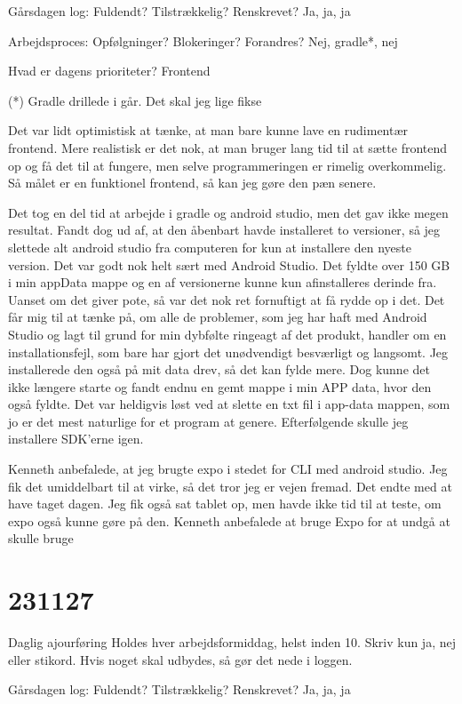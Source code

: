 \documentclass{report}
\begin{document}
Gårsdagen log: Fuldendt? Tilstrækkelig? Renskrevet?
Ja, ja, ja
 
Arbejdsproces: Opfølgninger? Blokeringer? Forandres?
Nej, gradle*, nej
 
Hvad er dagens prioriteter?
Frontend
 
(*) Gradle drillede i går. Det skal jeg lige fikse
 
Det var lidt optimistisk at tænke, at man bare kunne lave en rudimentær frontend. Mere realistisk er det nok, at man bruger lang tid til at sætte frontend op og få det til at fungere, men selve programmeringen er rimelig overkommelig.
Så målet er en funktionel frontend, så kan jeg gøre den pæn senere.
 
Det tog en del tid at arbejde i gradle og android studio, men det gav ikke megen resultat. Fandt dog ud af, at den åbenbart havde installeret to versioner, så jeg slettede alt android studio fra computeren for kun at installere den nyeste version.
Det var godt nok helt sært med Android Studio. Det fyldte over 150 GB i min appData mappe og en af versionerne kunne kun afinstalleres derinde fra.
Uanset om det giver pote, så var det nok ret fornuftigt at få rydde op i det.
Det får mig til at tænke på, om alle de problemer, som jeg har haft med Android Studio og lagt til grund for min dybfølte ringeagt af det produkt, handler om en installationsfejl, som bare har gjort det unødvendigt besværligt og langsomt.
Jeg installerede den også på mit data drev, så det kan fylde mere.
Dog kunne det ikke længere starte og fandt endnu en gemt mappe i min APP data, hvor den også fyldte. Det var heldigvis løst ved at slette en txt fil i app-data mappen, som jo er det mest naturlige for et program at genere. Efterfølgende skulle jeg installere SDK'erne igen.
 
Kenneth anbefalede, at jeg brugte expo i stedet for CLI med android studio. Jeg fik det umiddelbart til at virke, så det tror jeg er vejen fremad.
Det endte med at have taget dagen.
Jeg fik også sat tablet op, men havde ikke tid til at teste, om expo også kunne gøre på den.
Kenneth anbefalede at bruge Expo for at undgå at skulle bruge 

\section{231127}
Daglig ajourføring
Holdes hver arbejdsformiddag, helst inden 10. Skriv kun ja, nej eller stikord. Hvis noget skal udbydes, så gør det nede i loggen.
 
Gårsdagen log: Fuldendt? Tilstrækkelig? Renskrevet?
Ja, ja, ja
 
\end{document}
